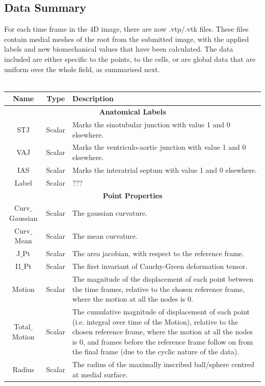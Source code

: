 \documentclass{article}
\begin{document}
\subsection*{Data Summary}
For each time frame in the 4D image, there are now .vtp/.vtk files. These files contain medial meshes of the root from the submitted image, with the applied labels and new biomechanical values that have been calculated. The data included are either specific to the points, to the cells, or are global data that are uniform over the whole field, as summarised next.
\\
~
\\
\begin{tabular}{|c|c|p{9.4cm}|}
	\hline
\textbf{Name}	& \textbf{Type} & \textbf{Description}   \\
	\hline
	\hline
	\multicolumn{3}{|c|}{\textbf{Anatomical Labels}} \\
	\hline
STJ	& Scalar  & Marks the sinotubular junction with value 1 and 0 elsewhere.  \\
	\hline
VAJ	& Scalar &  Marks the ventriculo-aortic junction with value 1 and 0 elsewhere.  \\
	\hline 
IAS	&Scalar &Marks the interatrial septum with value 1 and 0 elsewhere. \\
	\hline
Label	& Scalar & ???\\
\hline
\hline
\multicolumn{3}{|c|}{\textbf{Point Properties}} \\
	\hline
Curv$\_$Gaussian	& Scalar& The gaussian curvature.\\
\hline
Curv$\_$Mean	& Scalar& The mean curvature.\\
	\hline
J$\_$Pt	& Scalar& The area jacobian, with respect to the reference frame.\\
	\hline
I1$\_$Pt& Scalar & The first invariant of Cauchy-Green deformation tensor. \\
	\hline
Motion	& Scalar& The magnitude of the displacement of each point between the time frames, relative to the chosen reference frame, where the motion at all the nodes is 0.\\
	\hline
Total$\_$Motion	& Scalar& The cumulative magnitude of displacement of each point (i.e. integral over time of the Motion), relative to the chosen reference frame, where the motion at all the nodes is 0, and frames before the reference frame follow on from the final frame (due to the cyclic nature of the data).\\
	\hline
Radius	&Scalar & The radius of the maximally inscribed ball/sphere centred at medial surface.\\

\end{tabular}
\end{document}

